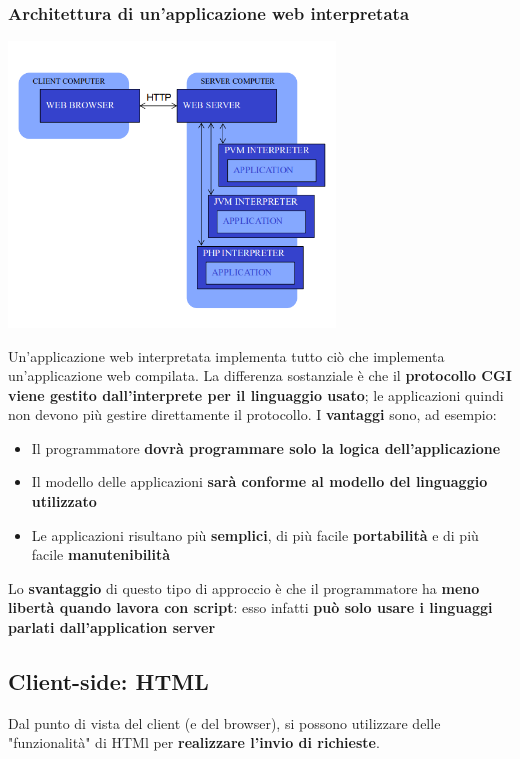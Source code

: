 \documentclass[12pt]{article}
\begin{document}
\subsubsection{Architettura di un'applicazione web interpretata}
\begin{center}
    \includegraphics[width = 0.65\textwidth]{Images/177.png}
\end{center}
Un'applicazione web interpretata implementa tutto ciò che implementa un'applicazione web compilata.
La differenza sostanziale è che il \textbf{protocollo CGI viene gestito dall'interprete per il linguaggio usato}; le applicazioni quindi non devono più gestire direttamente il protocollo.
I \textbf{vantaggi} sono, ad esempio:
\begin{itemize}
    \item Il programmatore \textbf{dovrà programmare solo la logica dell'applicazione}
    \item Il modello delle applicazioni \textbf{sarà conforme al modello del linguaggio utilizzato}
    \item Le applicazioni risultano più \textbf{semplici}, di più facile \textbf{portabilità} e di più facile \textbf{manutenibilità}
\end{itemize}
Lo \textbf{svantaggio} di questo tipo di approccio è che il programmatore ha \textbf{meno libertà quando lavora con script}: esso infatti \textbf{può solo usare i linguaggi parlati dall'application server}
\subsection{Client-side: HTML}
Dal punto di vista del client (e del browser), si possono utilizzare delle "funzionalità" di HTMl per \textbf{realizzare l'invio di richieste}.
\end{document}
